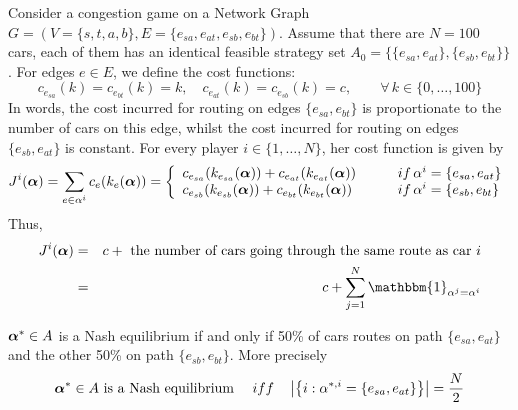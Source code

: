 Consider a congestion game on a Network Graph $G=(V=\{s,t,a,b\}, E=\{e_{sa}, e_{at}, e_{sb}, e_{bt} \})$. Assume that there are $N=100$ cars, each of them has an identical feasible strategy set $A_0 = \{ \{e_{sa},e_{at} \}, \{e_{sb}, e_{bt}\} \}$. For edges $e \in E$, we define the cost functions:
\begin{equation*}
	c_{e_{sa}} (k) = c_{e_{bt}} (k) = k, \quad c_{e_{at}}(k) = c_{e_{sb}}(k) = c, \qquad  \forall\, k \in \{0,\ldots, 100\}
\end{equation*}
In words, the cost incurred for routing on edges $\{e_{sa}, e_{bt} \}$ is proportionate to the number of cars on this edge, whilst the cost incurred for routing on edges $\{e_{sb}, e_{at} \}$ is constant. For every player $i \in \{1,\ldots, N\}$, her cost function is given by
\begin{equation}
	J^i(\boldsymbol{\alpha}) = \sum_{e \in \alpha^i} c_e (k_e(\boldsymbol{\alpha})) 
	= \left\{
		\begin{array}{ll}
			c_{e_{sa}}( k_{e_{sa}}(\boldsymbol{\alpha})) + c_{e_{at}}( k_{e_{at}}(\boldsymbol{\alpha}) ) &\qquad if \, \alpha^i = \{ e_{sa}, e_{at} \} \\
			c_{e_{sb}}( k_{e_{sb}}(\boldsymbol{\alpha})) + c_{e_{bt}}( k_{e_{bt}}(\boldsymbol{\alpha}) )   &\qquad if \, \alpha^i = \{ e_{sb}, e_{bt} \}
		\end{array}
	\right.
\end{equation}
Thus, 
\begin{eqnarray}
	J^i(\balpha) &=& c + \text{ the number of cars going through the same route as car } i  \nonumber \\
	&=& c + \sum_{j=1}^N \mathbbm{1}_{\alpha^{j} = \alpha^{i} }
\end{eqnarray}

\begin{lemma}
	$\boldsymbol{\alpha}^* \in A$ is a Nash equilibrium if and only if 50\% of cars routes on path $\{e_{sa}, e_{at}\}$ and the other 50\% on path $\{e_{sb}, e_{bt}\}$. More precisely
	$$
		\boldsymbol{\alpha}^* \in A \text{ is a Nash equilibrium }\quad  iff \quad  \left\vert \left\{ i : \alpha^{*,i} = \{e_{sa}, e_{at}\}  \right\}\right\vert = \frac{N}{2}
	$$ 
\end{lemma}

